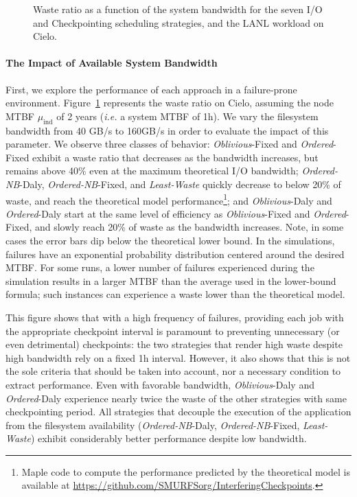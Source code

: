\documentclass[two]{article}
\newcommand{\ie}[0]{\emph{i.e.}\xspace}
\newcommand{\muind}{\mu_{\text{ind}}}
\newcommand{\nocoop}{\emph{Oblivious}\xspace}
\newcommand{\fifoblock}{\emph{Ordered}\xspace}
\newcommand{\fifononblock}{\emph{Ordered-NB}\xspace}
\newcommand{\leastwaste}{\emph{Least-Waste}\xspace}
\def\propfixed{\nocoop-Fixed\xspace}
\def\propdaly{\nocoop-Daly\xspace}
\def\bfifofixed{\fifoblock-Fixed\xspace}
\def\bfifodaly{\fifoblock-Daly\xspace}
\def\fifofixed{\fifononblock-Fixed\xspace}
\def\fifodaly{\fifononblock-Daly\xspace}
\def\cooperative{\leastwaste}
\begin{document}
\begin{figure}
  \begin{center}
    \resizebox{1.05\linewidth}{!}{}
  \end{center}
  \caption{Waste ratio as a function of the system bandwidth for the
    seven I/O and Checkpointing scheduling strategies, and the LANL workload on
    Cielo. \label{fig:cielo-1hmtbf}}
\end{figure}

\paragraph{The Impact of Available System Bandwidth}
First, we explore the performance of each approach in a failure-prone
environment. Figure~\ref{fig:cielo-1hmtbf} represents the waste ratio
on Cielo, assuming the node MTBF $\muind$ of 2 years (\ie a system
MTBF of 1h). We vary the filesystem bandwidth from 40 GB/s to 160GB/s
in order to evaluate the impact of this parameter. We observe three
classes of behavior: \propfixed and \bfifofixed exhibit a waste ratio
that decreases as the bandwidth increases, but remains above 40\% even
at the maximum theoretical I/O bandwidth; \fifodaly, \fifofixed, and
\cooperative quickly decrease to below 20\% of waste, and reach
the theoretical model performance\footnote{Maple code to compute the
  performance predicted by the theoretical model is available at
  \url{https://github.com/SMURFSorg/InterferingCheckpoints}.};
%
and \propdaly and \bfifodaly start at the same level of efficiency as
\propfixed and \bfifofixed, and slowly reach 20\% of waste as the bandwidth
increases.
%
Note, in some cases the error bars dip below the theoretical
lower bound. In the simulations, failures have an exponential probability
distribution centered around the desired MTBF. For some runs, a lower
number of failures experienced during the simulation results in a larger
MTBF than the average used in the lower-bound formula; such instances
can experience a waste lower than the theoretical model.

This figure shows that with a high frequency of failures, providing each job
with the appropriate checkpoint interval is paramount to preventing unnecessary
(or even detrimental) checkpoints: the two strategies that render high waste
despite high bandwidth rely on a fixed 1h interval. However, it also shows that
this is not the sole criteria that should be taken into account, nor a
necessary condition to extract performance. Even with favorable bandwidth,
\propdaly and \bfifodaly experience nearly twice the waste of the other
strategies with same checkpointing period. All strategies that decouple the
execution of the application from the filesystem availability (\fifodaly,
\fifofixed, \cooperative) exhibit considerably better performance despite low
bandwidth.
\end{document}
